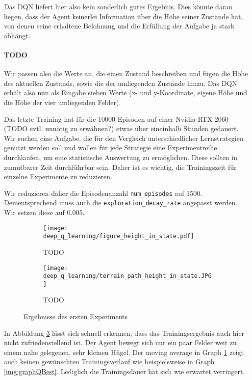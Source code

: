 Das DQN liefert hier also kein sonderlich gutes Ergebnis. Dies könnte daran liegen, dass der Agent keinerlei Information über die Höhe seiner Zustände hat, von denen seine erhaltene Belohnung und die Erfüllung der Aufgabe ja stark abhängt.

\paragraph{TODO}
 Wir passen also die Werte an, die einen Zustand beschreiben und fügen die Höhe des aktuellen Zustands, sowie die der umliegenden Zustände hinzu. Das DQN erhält also nun als Eingabe sieben Werte (x- und y-Koordinate, eigene Höhe und die Höhe der vier umliegenden Felder).

Das letzte Training hat für die 10000 Episoden auf einer Nvidia RTX 2060 (TODO evtl. unnötig zu erwähnen?) etwas über eineinhalb Stunden gedauert. Wir suchen eine Aufgabe, die für den Vergleich unterschiedlicher Lernstrategien genutzt werden soll und wollen für jede Strategie eine Experimentreihe durchlaufen, um eine statistische Auswertung zu ermöglichen. Diese sollten in zumutbarer Zeit durchführbar sein. Daher ist es wichtig, die Trainingszeit für einzelne Experimente zu reduzieren. 

Wir reduzieren daher die Episodenanzahl \texttt{num_episodes} auf 1500. Dementsprechend muss auch die \texttt{exploration_decay_rate} angepasst werden. Wir setzen diese auf 0.005.
\begin{figure}[H]
    \centering
    \begin{subfigure}[b]{0.49\textwidth}
        \texttt{[image: deep\_q\_learning/figure\_height\_in\_state.pdf]}
        \caption{TODO}
        \label{img:graphDeepQHeightInState}
    \end{subfigure}
    \begin{subfigure}[b]{0.49\textwidth}
        \texttt{[image: deep\_q\_learning/terrain\_path\_height\_in\_state.JPG]}
        \caption{TODO}
        \label{img:pathDeepQHeightInState}
    \end{subfigure}
    \caption{Ergebnisse des ersten Experiments}
\end{figure}
In Abbildung \ref{img:pathDeepQHeightInState} lässt sich schnell erkennen, dass das Trainingsergebnis auch hier nicht zufriedenstellend ist. Der Agent bewegt sich nur ein paar Felder weit zu einem nahe gelegenen, sehr kleinen Hügel. Der moving average in Graph \ref{img:graphDeepQHeightInState} zeigt auch keinen gewünschten Trainingsverlauf wie beispielsweise in Graph \ref{img:graphQBest}. Lediglich die Trainingsdauer hat sich wie erwartet verringert.


